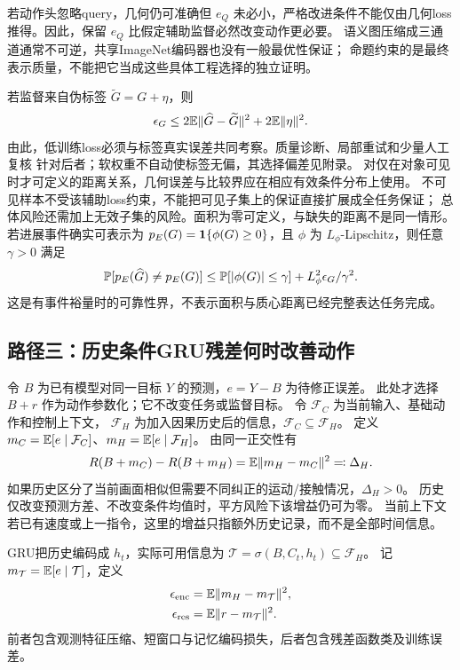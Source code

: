 若动作头忽略query，几何仍可准确但 $e_Q$ 未必小，严格改进条件不能仅由几何loss
推得。因此，保留 $e_Q$ 比假定辅助监督必然改变动作更必要。
语义图压缩成三通道通常不可逆，共享ImageNet编码器也没有一般最优性保证；
命题约束的是最终表示质量，不能把它当成这些具体工程选择的独立证明。

若监督来自伪标签 $\widetilde G=G+\eta$，则
\begin{equation}
 \epsilon_G\leq2\mathbb E\lVert\widehat G-\widetilde G\rVert^2+2\mathbb E\lVert\eta\rVert^2.
 \label{eq:noise}
\end{equation}
由此，低训练loss必须与标签真实误差共同考察。质量诊断、局部重试和少量人工复核
针对后者；软权重不自动使标签无偏，其选择偏差见附录。
对仅在对象可见时才可定义的距离关系，几何误差与比较界应在相应有效条件分布上使用。
不可见样本不受该辅助loss约束，不能把可见子集上的保证直接扩展成全任务保证；
总体风险还需加上无效子集的风险。面积为零可定义，与缺失的距离不是同一情形。
若进展事件确实可表示为 $p_E(G)=\mathbf 1\{\phi(G)\geq0\}$，且 $\phi$ 为
$L_\phi$-Lipschitz，则任意 $\gamma>0$ 满足
\begin{equation}
 \mathbb P[p_E(\widehat G)\ne p_E(G)]
 \leq\mathbb P[|\phi(G)|\leq\gamma]+L_\phi^2\epsilon_G/\gamma^2.
 \label{eq:margin}
\end{equation}
这是有事件裕量时的可靠性界，不表示面积与质心距离已经完整表达任务完成。

\subsection{路径三：历史条件GRU残差何时改善动作}
令 $B$ 为已有模型对同一目标 $Y$ 的预测，$e=Y-B$ 为待修正误差。
此处才选择 $B+r$ 作为动作参数化；它不改变任务或监督目标。
令 $\mathcal F_C$ 为当前输入、基础动作和控制上下文，
$\mathcal F_H$ 为加入因果历史后的信息，$\mathcal F_C\subseteq\mathcal F_H$。
定义 $m_C=\mathbb E[e\mid\mathcal F_C]$、$m_H=\mathbb E[e\mid\mathcal F_H]$。
由同一正交性有
\begin{equation}
 R(B+m_C)-R(B+m_H)=\mathbb E\lVert m_H-m_C\rVert^2
 \eqqcolon\Delta_H.
 \label{eq:historygain}
\end{equation}
如果历史区分了当前画面相似但需要不同纠正的运动/接触情况，$\Delta_H>0$。
历史仅改变预测方差、不改变条件均值时，平方风险下该增益仍可为零。
当前上下文若已有速度或上一指令，这里的增益只指额外历史记录，而不是全部时间信息。

GRU把历史编码成 $h_t$，实际可用信息为
$\mathcal T=\sigma(B,C_t,h_t)\subseteq\mathcal F_H$。
记 $m_\mathcal T=\mathbb E[e\mid\mathcal T]$，定义
\begin{align}
 \epsilon_{\mathrm{enc}}&=\mathbb E\lVert m_H-m_\mathcal T\rVert^2,\nonumber\\
 \epsilon_{\mathrm{res}}&=\mathbb E\lVert r-m_\mathcal T\rVert^2.
 \label{eq:reserrors}
\end{align}
前者包含观测特征压缩、短窗口与记忆编码损失，后者包含残差函数类及训练误差。

